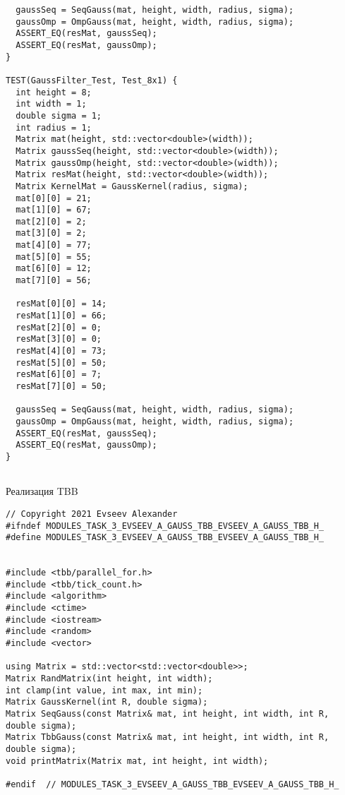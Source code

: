 \documentclass{report}
\begin{document}
\begin{lstlisting}
  gaussSeq = SeqGauss(mat, height, width, radius, sigma);
  gaussOmp = OmpGauss(mat, height, width, radius, sigma);
  ASSERT_EQ(resMat, gaussSeq);
  ASSERT_EQ(resMat, gaussOmp);
}

TEST(GaussFilter_Test, Test_8x1) {
  int height = 8;
  int width = 1;
  double sigma = 1;
  int radius = 1;
  Matrix mat(height, std::vector<double>(width));
  Matrix gaussSeq(height, std::vector<double>(width));
  Matrix gaussOmp(height, std::vector<double>(width));
  Matrix resMat(height, std::vector<double>(width));
  Matrix KernelMat = GaussKernel(radius, sigma);
  mat[0][0] = 21;
  mat[1][0] = 67;
  mat[2][0] = 2;
  mat[3][0] = 2;
  mat[4][0] = 77;
  mat[5][0] = 55;
  mat[6][0] = 12;
  mat[7][0] = 56;

  resMat[0][0] = 14;
  resMat[1][0] = 66;
  resMat[2][0] = 0;
  resMat[3][0] = 0;
  resMat[4][0] = 73;
  resMat[5][0] = 50;
  resMat[6][0] = 7;
  resMat[7][0] = 50;

  gaussSeq = SeqGauss(mat, height, width, radius, sigma);
  gaussOmp = OmpGauss(mat, height, width, radius, sigma);
  ASSERT_EQ(resMat, gaussSeq);
  ASSERT_EQ(resMat, gaussOmp);
}


\end{lstlisting}
Реализация TBB
\begin{lstlisting}
// Copyright 2021 Evseev Alexander
#ifndef MODULES_TASK_3_EVSEEV_A_GAUSS_TBB_EVSEEV_A_GAUSS_TBB_H_
#define MODULES_TASK_3_EVSEEV_A_GAUSS_TBB_EVSEEV_A_GAUSS_TBB_H_


#include <tbb/parallel_for.h>
#include <tbb/tick_count.h>
#include <algorithm>
#include <ctime>
#include <iostream>
#include <random>
#include <vector>

using Matrix = std::vector<std::vector<double>>;
Matrix RandMatrix(int height, int width);
int clamp(int value, int max, int min);
Matrix GaussKernel(int R, double sigma);
Matrix SeqGauss(const Matrix& mat, int height, int width, int R, double sigma);
Matrix TbbGauss(const Matrix& mat, int height, int width, int R, double sigma);
void printMatrix(Matrix mat, int height, int width);

#endif  // MODULES_TASK_3_EVSEEV_A_GAUSS_TBB_EVSEEV_A_GAUSS_TBB_H_

\end{lstlisting}
\end{document}
